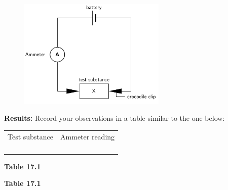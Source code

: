         \label{m38720*id334362}
    \setcounter{subfigure}{0}
	\begin{figure}[H] %
    \begin{center}
    \label{m38720*id334366!!!underscore!!!media}\label{m38720*id334366!!!underscore!!!printimage}\includegraphics[width=7cm]{col11305.imgs/m38720_CG10C8_003.png} %
      \vspace{2pt}
    \vspace{.1in}
    \end{center}
 \end{figure}       
        \par 
        \label{m38720*id334372}\noindent{}\textbf{Results:}
          \newline
        Record your observations in a table similar to the one below:
          \begin{table}[H]
        \begin{center}
      \label{m38720*id334385}
    \noindent
      \tablelasttail{}
      \begin{xtabular}[t]{|l|l|}\hline
        Test substance &
        Ammeter reading%
     \tabularnewline{}
         &
     \tabularnewline{}
         &
     \tabularnewline{}
         &
     \tabularnewline{}
         &
     \tabularnewline{}
    \end{xtabular}
      \end{center}
    \begin{center}{\small\bfseries Table 17.1}\end{center}
    \begin{caption}{\small\bfseries Table 17.1}\end{caption}
\end{table}
